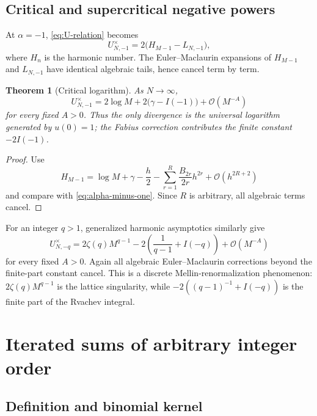 \documentclass[11pt,oneside]{article}
\numberwithin{equation}{section}
\newtheorem{theorem}{Theorem}[section]
\theoremstyle{definition}
\theoremstyle{remark}
\newcommand{\bigO}{\mathcal O}
\begin{document}
\subsection{Critical and supercritical negative powers}

At \(\alpha=-1\), \eqref{eq:U-relation} becomes
\begin{equation}
 U_{N,-1}^{\times}=2\bigl(H_{M-1}-L_{N,-1}\bigr),
 \label{eq:U-critical-exact}
\end{equation}
where \(H_n\) is the harmonic number.  The Euler--Maclaurin expansions of
\(H_{M-1}\) and \(L_{N,-1}\) have identical algebraic tails, hence cancel term by term.

\begin{theorem}[Critical logarithm]
\label{thm:critical-log}
As \(N\to\infty\),
\begin{equation}
 \boxed{\displaystyle
 U_{N,-1}^{\times}
 =2\log M+2\bigl(\gamma-I(-1)\bigr)+\bigO(M^{-A})}
 \label{eq:critical-log}
\end{equation}
for every fixed \(A>0\).  Thus the only divergence is the universal logarithm generated
by \(u(0)=1\); the Fabius correction contributes the finite constant \(-2I(-1)\).
\end{theorem}

\begin{proof}
Use
\[
 H_{M-1}=\log M+\gamma-\frac h2-
 \sum_{r=1}^{R}\frac{B_{2r}}{2r}h^{2r}+\bigO(h^{2R+2})
\]
and compare with \eqref{eq:alpha-minus-one}.  Since \(R\) is arbitrary, all algebraic
terms cancel.
\end{proof}

For an integer \(q>1\), generalized harmonic asymptotics similarly give
\begin{equation}
 \boxed{\displaystyle
 U_{N,-q}^{\times}
 =2\zeta(q)M^{q-1}
 -2\left(\frac1{q-1}+I(-q)\right)
 +\bigO(M^{-A})}
 \label{eq:U-q}
\end{equation}
for every fixed \(A>0\).  Again all algebraic Euler--Maclaurin corrections beyond the
finite-part constant cancel.  This is a discrete Mellin-renormalization phenomenon:
\(2\zeta(q)M^{q-1}\) is the lattice singularity, while
\(-2((q-1)^{-1}+I(-q))\) is the finite part of the Rvachev integral.

\section{Iterated sums of arbitrary integer order}
\label{sec:iterated}

\subsection{Definition and binomial kernel}
\end{document}
